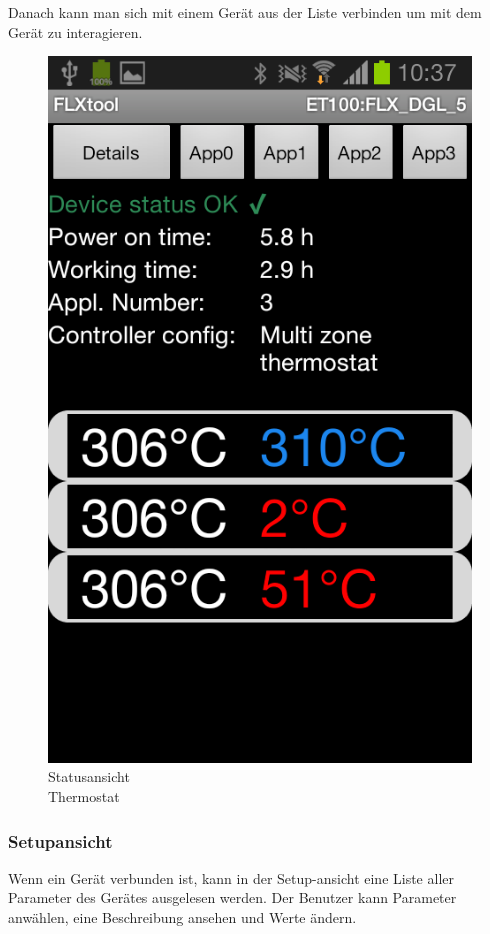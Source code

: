 Danach kann man sich mit einem Gerät aus der Liste verbinden um mit dem Gerät zu interagieren.
\vspace{16pt}

\begin{figure}
	\includegraphics[scale=0.3]{analysis/res/ShowStatusThermostat}
	\caption{Statusansicht \\Thermostat}
\end{figure}

\subsubsection{Setupansicht}
\label{subsubsec:Setupansicht}
Wenn ein Gerät verbunden ist, kann in der Setup-ansicht eine Liste aller Parameter des Gerätes ausgelesen werden. Der Benutzer kann Parameter anwählen, eine Beschreibung ansehen und Werte ändern.

